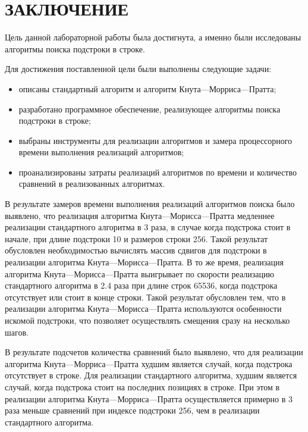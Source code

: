 \chapter*{ЗАКЛЮЧЕНИЕ}

Цель данной лабораторной работы была достигнута, а именно были исследованы алгоритмы поиска подстроки в строке.

Для достижения поставленной цели были выполнены следующие задачи:
\begin{itemize}
	\item описаны стандартный алгоритм и алгоритм Кнута---Морриса---Пратта;
	\item разработано программное обеспечение, реализующее алгоритмы поиска подстроки в строке;
	\item выбраны инструменты для реализации алгоритмов и замера процессорного времени выполнения реализаций алгоритмов;
	\item проанализированы затраты реализаций алгоритмов по времени и количество сравнений в реализованных алгоритмах.
\end{itemize}

В результате замеров времени выполнения реализаций алгоритмов поиска было выявлено, что реализация алгоритма Кнута---Морисса---Пратта медленнее реализации стандартного алгоритма в 3 раза, в случае когда подстрока стоит в начале, при длине подстроки 10 и размеров строки 256. 
Такой результат обусловлен необходимостью вычислять массив сдвигов для подстроки в реализации алгоритма Кнута---Морисса---Пратта.
В то же время, реализация алгоритма Кнута---Морисса---Пратта выигрывает по скорости реализацию стандартного алгоритма в 2.4 раза при длине строк 65536, когда подстрока отсутствует или стоит в конце строки. 
Такой результат обусловлен тем, что в реализации алгоритма Кнута---Морисса---Пратта используются особенности искомой подстроки, что позволяет осуществлять смещения сразу на несколько шагов.

В результате подсчетов количества сравнений было выявлено, что для реализации алгоритма Кнута---Морриса---Пратта худшим является случай, когда подстрока отсутствует в строке. 
Для реализации стандартного алгоритма, худшим является случай, когда подстрока стоит на последних позициях в строке. 
При этом в реализации алгоритма Кнута---Морриса---Пратта осуществляется примерно в 3 раза меньше сравнений при индексе подстроки 256, чем в реализации стандартного алгоритма.


